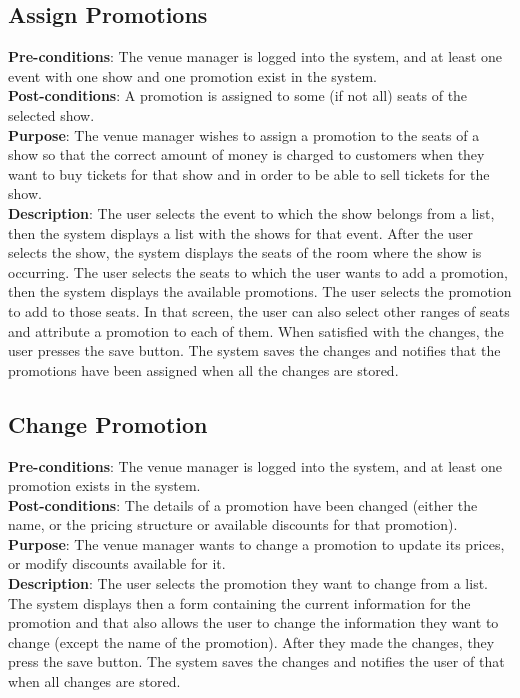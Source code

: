 \subsection{Assign Promotions}
\textbf{Pre-conditions}: The venue manager is logged into the system,
and at least one event with one show and one promotion exist in the
system.\\

\textbf{Post-conditions}: A promotion is assigned to some (if not all) seats of
the selected show.\\

\textbf{Purpose}: The venue manager wishes to assign a promotion to the
seats of a show so that the correct amount of money is charged to
customers when they want to buy tickets for that show and in order
to be able to sell tickets for the show.\\

\textbf{Description}: The user selects the event to which the show
belongs from a list, then the system displays a list with the shows
for that event. After the user selects the show, the system displays
the seats of the room where the show is occurring. The user selects
the seats to which the user wants to add a promotion, then the
system displays the available promotions. The user selects the
promotion to add to those seats. In that screen, the user can also
select other ranges of seats and attribute a promotion to each of them.
When satisfied with the changes, the user presses the save button.
The system saves the changes and notifies that the promotions have
been assigned when all the changes are stored.

\subsection{Change Promotion}
\textbf{Pre-conditions}: The venue manager is logged into the system,
and at least one promotion exists in the system.\\

\textbf{Post-conditions}: The details of a promotion have been changed
(either the name, or the pricing structure or available discounts
for that promotion).\\

\textbf{Purpose}: The venue manager wants to change a promotion to
update its prices, or modify discounts available for it.\\

\textbf{Description}: The user selects the promotion they want to
change from a list. The system displays then a form containing the
current information for the promotion and that also allows the user
to change the information they want to change (except the name of
the promotion). After they made the changes, they press the save
button. The system saves the changes and notifies the user of that
when all changes are stored.

